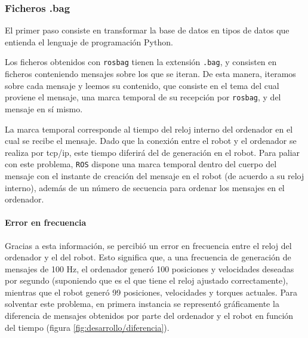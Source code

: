 \subsubsection{Ficheros .bag}
El primer paso consiste en transformar la base de datos en tipos de datos que entienda el lenguaje de programación Python.

Los ficheros obtenidos con \verb|rosbag| tienen la extensión \verb|.bag|, y consisten en ficheros conteniendo mensajes sobre los que se iteran. De esta manera, iteramos sobre cada mensaje y leemos su contenido, que consiste en el tema del cual proviene el mensaje, una marca temporal de su recepción por \verb|rosbag|, y del mensaje en sí mismo.

La marca temporal corresponde al tiempo del reloj interno del ordenador en el cual se recibe el mensaje. Dado que la conexión entre el robot y el ordenador se realiza por tcp/ip, este tiempo diferirá del de generación en el robot. Para paliar con este problema, \verb|ROS| dispone una marca temporal dentro del cuerpo del mensaje con el instante de creación del mensaje en el robot (de acuerdo a su reloj interno), además de un número de secuencia para ordenar los mensajes en el ordenador.

\paragraph{Error en frecuencia}
Gracias a esta información, se percibió un error en frecuencia entre el reloj del ordenador y el del robot. Esto significa que, a una frecuencia de generación de mensajes de 100 Hz, el ordenador generó 100 posiciones y velocidades deseadas por segundo (suponiendo que es el que tiene el reloj ajustado correctamente), mientras que el robot generó 99 posiciones, velocidades y torques actuales. Para solventar este problema, en primera instancia se representó gráficamente la diferencia de mensajes obtenidos por parte del ordenador y el robot en función del tiempo (figura \ref{fig:desarrollo/diferencia}).


